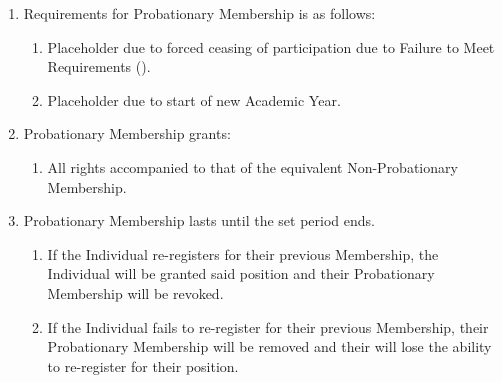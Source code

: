 \begin{enumerate}
	\item Requirements for Probationary Membership is as follows:
		\begin{enumerate}
			\item Placeholder due to forced ceasing of participation due to Failure to
				Meet Requirements ().

			\item Placeholder due to start of new Academic Year.
		\end{enumerate}

	\item Probationary Membership grants:
		\begin{enumerate}
			\item All rights accompanied to that of the equivalent Non-Probationary Membership.
		\end{enumerate}

	\item Probationary Membership lasts until the set period ends.
		\begin{enumerate}
			\item If the Individual re-registers for their previous Membership, the
				Individual will be granted said position and their Probationary
				Membership will be revoked.

			\item If the Individual fails to re-register for their previous Membership,
				their Probationary Membership will be removed and their will lose the
				ability to re-register for their position.
		\end{enumerate}
\end{enumerate}

